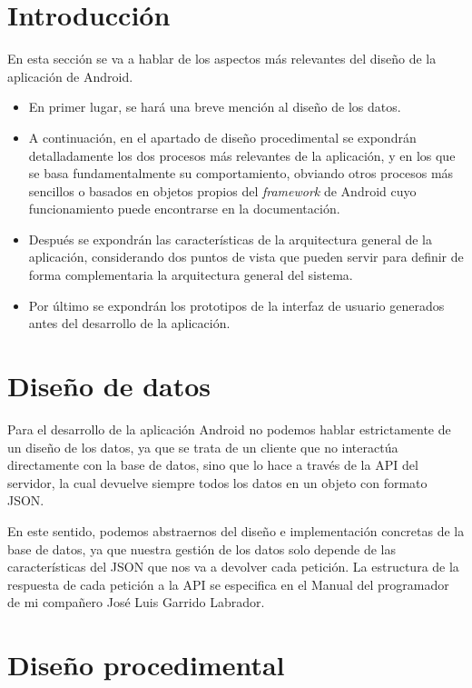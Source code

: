 
\section{Introducción}
En esta sección se va a hablar de los aspectos más relevantes del diseño de la aplicación de Android.
\begin{itemize}
	\item En primer lugar, se hará una breve mención al diseño de los datos.
	\item A continuación, en el apartado de diseño procedimental se expondrán detalladamente los dos procesos más relevantes de la aplicación, y en los que se basa fundamentalmente su comportamiento, obviando otros procesos más sencillos o basados en objetos propios del \textit{framework} de Android cuyo funcionamiento puede encontrarse en la documentación.
	\item Después se expondrán las características de la arquitectura general de la aplicación, considerando dos puntos de vista que pueden servir para definir de forma complementaria la arquitectura general del sistema. 
	\item Por último se expondrán los prototipos de la interfaz de usuario generados antes del desarrollo de la aplicación. 
\end{itemize}

\section{Diseño de datos}

Para el desarrollo de la aplicación Android no podemos hablar estrictamente de un diseño de los datos, ya que se trata de un cliente que no interactúa directamente con la base de datos, sino que lo hace a través de la API del servidor, la cual devuelve siempre todos los datos en un objeto con formato JSON. 

En este sentido, podemos abstraernos del diseño e implementación concretas de la base de datos, ya que nuestra gestión de los datos solo depende de las características del JSON que nos va a devolver cada petición. La estructura de la respuesta de cada petición a la API se especifica en el Manual del programador de mi compañero José Luis Garrido Labrador. 

\section{Diseño procedimental}

